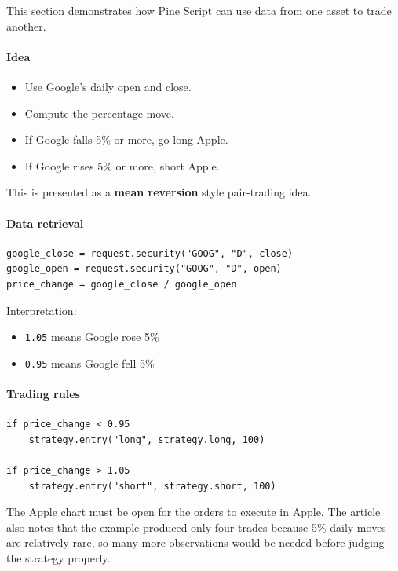 \documentclass[12pt,openany]{book}
\begin{document}
This section demonstrates how Pine Script can use data from one asset to trade another.

\paragraph{Idea}

\begin{itemize}[leftmargin=*]
    \item Use Google's daily open and close.
    \item Compute the percentage move.
    \item If Google falls 5\% or more, go long Apple.
    \item If Google rises 5\% or more, short Apple.
\end{itemize}

This is presented as a \textbf{mean reversion} style pair-trading idea.

\paragraph{Data retrieval}

\begin{Verbatim}[breaklines=true,breakanywhere=true,fontsize=\small]
google_close = request.security("GOOG", "D", close)
google_open = request.security("GOOG", "D", open)
price_change = google_close / google_open
\end{Verbatim}

Interpretation:

\begin{itemize}[leftmargin=*]
    \item \texttt{1.05} means Google rose 5\%
    \item \texttt{0.95} means Google fell 5\%
\end{itemize}

\paragraph{Trading rules}

\begin{Verbatim}[breaklines=true,breakanywhere=true,fontsize=\small]
if price_change < 0.95
    strategy.entry("long", strategy.long, 100)

if price_change > 1.05
    strategy.entry("short", strategy.short, 100)
\end{Verbatim}

The Apple chart must be open for the orders to execute in Apple. The article also notes that the example produced only four trades because 5\% daily moves are relatively rare, so many more observations would be needed before judging the strategy properly.
\end{document}
